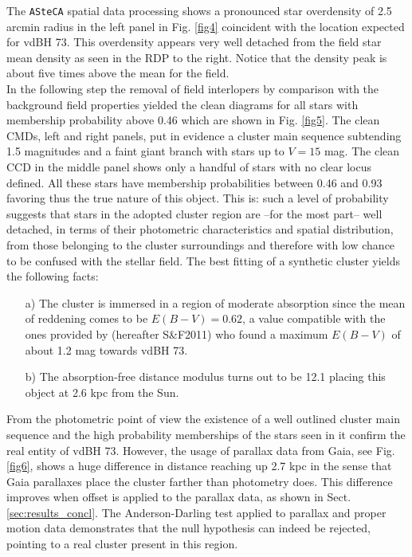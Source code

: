 \documentclass[draft]{aa}
\begin{document}
The \texttt{ASteCA} spatial data processing shows a pronounced star overdensity
of 2.5 arcmin radius in the left panel in Fig. \ref{fig4} coincident with the
location expected for vdBH 73. This overdensity appears very well
detached from the field star mean density as seen in the RDP to the right.
Notice that the density peak is about five times above the mean for the field.\\

In the following step the removal of field interlopers by comparison with the
background field properties yielded the clean diagrams for all stars with
membership probability above 0.46 which are shown in Fig. \ref{fig5}. The clean
CMDs, left and right panels, put in evidence a cluster main sequence subtending
1.5 magnitudes and a faint giant branch with stars up to $V=15$ mag. The clean
CCD in the middle panel shows only a handful of stars with no clear locus
defined. All these stars have membership probabilities between 0.46 and 0.93
favoring thus the true nature of this object. This is: such a level of
probability suggests that stars in the adopted cluster region are --for the
most part-- well detached, in terms of their photometric characteristics and
spatial distribution, from those belonging to the cluster surroundings and
therefore with low chance to be confused with the stellar field. The best
fitting of a synthetic cluster yields the following facts:

\begin{itemize}
\item [a)] The cluster is immersed in a region of moderate absorption since the
mean of reddening comes to be $E(B-V) = 0.62$, a value compatible with the
ones provided by \cite{Schlafly_2011} (hereafter S\&F2011) who
found a maximum $E(B-V)$ of about 1.2 mag towards vdBH 73.
\item [b)] The absorption-free distance modulus turns out to be 12.1 placing
this object at 2.6 kpc from the Sun.
\end{itemize}

From the photometric point of view the existence of a well outlined cluster main
sequence and the high probability memberships of the stars seen in it confirm
the real entity of vdBH 73. However, the usage of parallax data
from Gaia, see Fig. \ref{fig6}, shows a huge difference in distance reaching
up 2.7 kpc in the sense that Gaia parallaxes place the cluster farther than
photometry does. This difference improves when offset is applied to the
parallax data, as shown in Sect. \ref{sec:results_concl}.
The Anderson-Darling test applied to parallax and proper motion
data demonstrates that the null hypothesis can indeed be rejected, pointing to
a real cluster present in this region.\\
\end{document}
